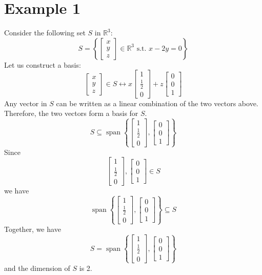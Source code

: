 \section{\small Example 1}

Consider the following set $S$ in $\mathbb{R}^3$:
\[
	S = \left\{
	\begin{bmatrix}
		x \\ y \\ z
	\end{bmatrix}
	\in \mathbb{R}^3
	\text{ s.t. }
	x - 2y = 0
	\right\}
\]
Let us construct a basis:
\[
	\begin{bmatrix}
		x \\ y \\ z
	\end{bmatrix} \in S
	\leftrightarrow
	x
	\begin{bmatrix}
		1 \\ \frac{1}{2} \\ 0
	\end{bmatrix} +
	z
	\begin{bmatrix}
		0 \\ 0 \\ 1
	\end{bmatrix}
\]
Any vector in $S$ can be written as a linear combination of the
two vectors above. Therefore, the two vectors form a basis for $S$.
\[
	S \subseteq \operatorname{span}\left\{
	\begin{bmatrix}
		1 \\ \frac{1}{2} \\ 0
	\end{bmatrix},
	\begin{bmatrix}
		0 \\ 0 \\ 1
	\end{bmatrix}
	\right\}
\]
Since
\[
	\begin{bmatrix}
		1 \\ \frac{1}{2} \\ 0
	\end{bmatrix},
	\begin{bmatrix}
		0 \\ 0 \\ 1
	\end{bmatrix}
	\in S
\]
we have
\[
	\operatorname{span}\left\{
	\begin{bmatrix}
		1 \\ \frac{1}{2} \\ 0
	\end{bmatrix},
	\begin{bmatrix}
		0 \\ 0 \\ 1
	\end{bmatrix}
	\right\}
	\subseteq S
\]
Together, we have
\[
	S = \operatorname{span}\left\{
	\begin{bmatrix}
		1 \\ \frac{1}{2} \\ 0
	\end{bmatrix},
	\begin{bmatrix}
		0 \\ 0 \\ 1
	\end{bmatrix}
	\right\}
\]
and the dimension of $S$ is 2.

